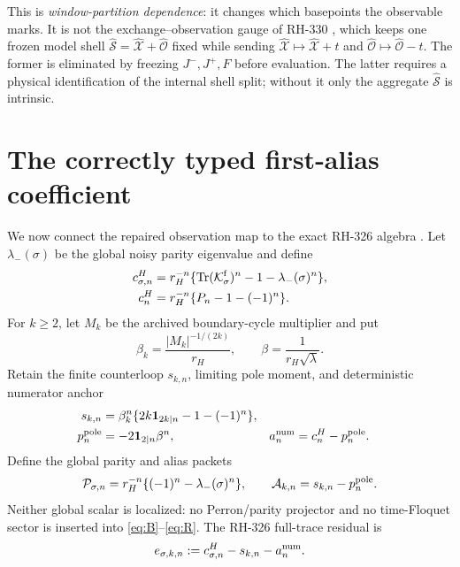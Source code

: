 \documentclass[11pt]{article}
\theoremstyle{remark}
\newcommand{\Tr}{\operatorname{Tr}}
\newcommand{\one}{\mathbf 1}
\newcommand{\cA}{\mathcal A}
\newcommand{\cK}{\mathcal K}
\newcommand{\cP}{\mathcal P}
\begin{document}
This is \emph{window-partition dependence}: it changes which basepoints the
observable marks.  It is not the exchange--observation gauge of RH-330
\citep{WangFullTraceTransfer2026}, which keeps one frozen model shell
$\widehat{\mathcal S}=\widehat{\mathcal X}+\widehat{\mathcal O}$ fixed while
sending $\widehat{\mathcal X}\mapsto\widehat{\mathcal X}+t$ and
$\widehat{\mathcal O}\mapsto\widehat{\mathcal O}-t$.  The former is eliminated by
freezing $J^-,J^+,F$ before evaluation.  The latter requires a physical
identification of the internal shell split; without it only the aggregate
$\widehat{\mathcal S}$ is intrinsic.

\section{The correctly typed first-alias coefficient}

We now connect the repaired observation map to the exact RH-326 algebra
\citep{WangFirstAlias2026}.  Let $\lambda_-(\sigma)$ be the global noisy
parity eigenvalue and define
\begin{align}
 c^H_{\sigma,n}
 &=r_H^{-n}\{\Tr(\cK_\sigma^{\rm f})^n-1-\lambda_-(\sigma)^n\},
 \label{eq:cHs}\\
 c^H_n&=r_H^{-n}\{P_n-1-(-1)^n\}.
 \label{eq:cH0}
\end{align}
For $k\ge2$, let $M_k$ be the archived boundary-cycle multiplier and put
\begin{equation}\label{eq:beta-data}
 \beta_k=\frac{|M_k|^{-1/(2k)}}{r_H},
 \qquad
 \beta=\frac1{r_H\sqrt\lambda}.
\end{equation}
Retain the finite counterloop $s_{k,n}$, limiting pole moment, and
deterministic numerator anchor
\begin{align}
 s_{k,n}
 &=\beta_k^n\{2k\one_{2k\mid n}-1-(-1)^n\},\label{eq:counterloop}\\
 p_n^{\rm pole}&=-2\one_{2\mid n}\beta^n,
 &a_n^{\rm num}&=c^H_n-p_n^{\rm pole}.\label{eq:num-anchor}
\end{align}
Define the global parity and alias packets
\begin{equation}\label{eq:PA}
 \cP_{\sigma,n}=r_H^{-n}\{(-1)^n-\lambda_-(\sigma)^n\},
 \qquad
 \cA_{k,n}=s_{k,n}-p_n^{\rm pole}.
\end{equation}
Neither global scalar is localized: no Perron/parity projector and no
time-Floquet sector is inserted into \eqref{eq:B}--\eqref{eq:R}.
The RH-326 full-trace residual is
\begin{equation}\label{eq:e-residual}
 e_{\sigma,k,n}
 :=c^H_{\sigma,n}-s_{k,n}-a_n^{\rm num}.
\end{equation}
\end{document}
